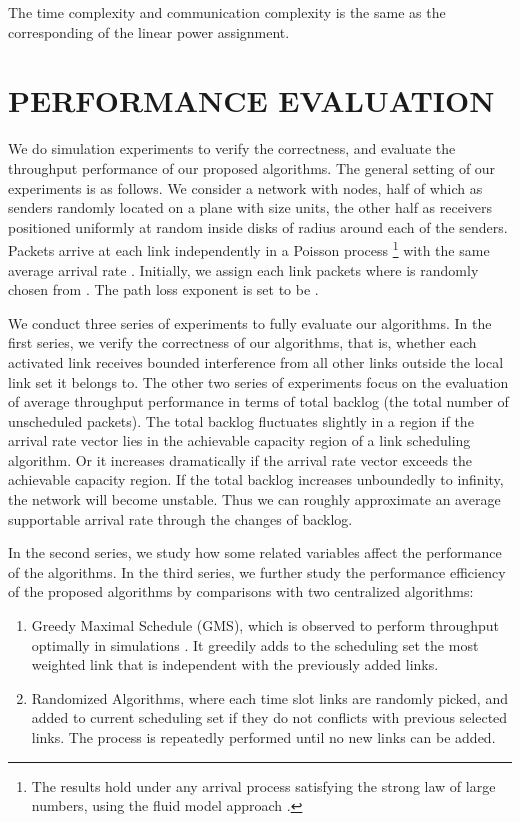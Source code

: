 \documentclass[journal]{IEEEtran}
\begin{document}
The time complexity and communication complexity is the same as the corresponding of the linear power assignment.
\section{PERFORMANCE EVALUATION}

We do simulation experiments to verify the correctness, and evaluate the throughput performance of our proposed algorithms.
The general setting of our experiments is as follows. We consider a network with  nodes, half of which as senders randomly located on a plane with size  units, the other half as receivers positioned uniformly at random
inside disks of radius  around each of the senders. Packets arrive at each link independently in a Poisson process \footnote{The results hold under any arrival process satisfying the strong law of large numbers, using the fluid model approach \cite{sha07} \cite{S:pick3}.} with the same average arrival rate . Initially, we assign each link  packets where  is randomly chosen from . The path loss exponent is set to be .

We  conduct three series of experiments to fully evaluate our algorithms. In the first series, we verify the correctness of our algorithms, that is, whether each activated link receives bounded interference from all other links outside the local link set it belongs to. The other two series of experiments focus on the evaluation of average throughput performance in terms of total backlog (the total number of unscheduled packets).
The total backlog fluctuates slightly in a region if the arrival rate vector lies in the achievable capacity region of a link scheduling  algorithm. Or it increases dramatically if the arrival rate vector exceeds the achievable capacity region. If the total backlog increases unboundedly to infinity, the network will become unstable. Thus we can roughly approximate an average supportable arrival rate through the changes of backlog.

In the second series, we study how some related variables affect the performance of the algorithms.
In the third series, we further study the performance efficiency of the proposed algorithms by comparisons with two centralized algorithms:
\begin{enumerate}
  \item Greedy Maximal Schedule (GMS), which is observed to perform throughput optimally in simulations \cite{S:GMS}. It greedily adds to the scheduling set the most weighted link that is independent with the previously added links.
  \item Randomized Algorithms, where each time slot links are randomly picked, and added to current scheduling set if they do not conflicts with previous selected links. The process is repeatedly performed until no new links can be added.
\end{enumerate}
\end{document}
